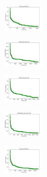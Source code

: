 \begin{figure}[H]
    \centering
    \begin{subfigure}
        \centering
        \includegraphics[width=0.234\textwidth]{img/hs/iris_set_const_10_949004259_cost.png}
    \end{subfigure}
    \hfill
    \begin{subfigure}
        \centering
        \includegraphics[width=0.234\textwidth]{img/hs/ecoli_set_const_10_949004259_cost.png}
    \end{subfigure}
    \hfill
    \begin{subfigure}
        \centering
        \includegraphics[width=0.234\textwidth]{img/hs/rand_set_const_10_949004259_cost.png}
    \end{subfigure}
    \hfill
    \begin{subfigure}
        \centering
        \includegraphics[width=0.234\textwidth]{img/hs/newthyroid_set_const_10_949004259_cost.png}
    \end{subfigure}
    \hfill
    \begin{subfigure}
        \centering
        \includegraphics[width=0.234\textwidth]{img/hs/iris_set_const_10_589741062_cost.png}
    \end{subfigure}
    \hfill
    \begin{subfigure}

\end{subfigure}
\end{figure}
